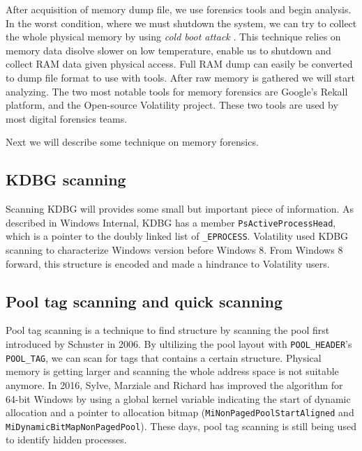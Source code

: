 After acquisition of memory dump file, we use forensics tools and begin analysis. In the worst condition, where we must shutdown the system, we can try to collect the whole physical memory by using \textit{cold boot attack} \cite{coldboot}. This technique relies on memory data disolve slower on low temperature, enable us to shutdown and collect RAM data given physical access. Full RAM dump can easily be converted to dump file format to use with tools. After raw memory is gathered we will start analyzing. The two most notable tools for memory forensics are Google's Rekall platform, and the Open-source Volatility project. These two tools are used by most digital forensics teams.

Next we will describe some technique on memory forensics.

\subsection[KDBG scanning]{KDBG scanning}

Scanning KDBG will provides some small but important piece of information. As described in Windows Internal, KDBG has a member \texttt{PsActiveProcessHead}, which is a pointer to the doubly linked list of \texttt{\_EPROCESS}. Volatility used KDBG scanning to characterize Windows version before Windows 8. From Windows 8 forward, this structure is encoded and made a hindrance to Volatility users.

\subsection[Pool tag scanning and quick scanning]{Pool tag scanning and quick scanning}
\label{sec:pooltagscanning}

Pool tag scanning is a technique to find structure by scanning the pool first introduced by Schuster \cite{pooltagscan} in 2006. By ultilizing the pool layout with \texttt{POOL\_HEADER}'s \texttt{POOL\_TAG}, we can scan for tags that contains a certain structure. Physical memory is getting larger and scanning the whole address space is not suitable anymore. In 2016, Sylve, Marziale and Richard \cite{sylve2016pool} has improved the algorithm for 64-bit Windows by using a global kernel variable indicating the start of dynamic allocation and a pointer to allocation bitmap (\texttt{MiNonPagedPoolStartAligned} and \texttt{MiDynamicBitMapNonPagedPool}). These days, pool tag scanning is still being used to identify hidden processes.
